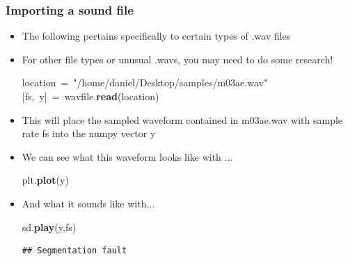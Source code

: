 \documentclass{beamer}\usepackage[]{graphicx}\usepackage[]{color}
\makeatletter
\newcommand{\hlstr}[1]{\textcolor[rgb]{0.192,0.494,0.8}{#1}}%
\newcommand{\hlopt}[1]{\textcolor[rgb]{0,0,0}{#1}}%
\newcommand{\hlstd}[1]{\textcolor[rgb]{0.345,0.345,0.345}{#1}}%
\newcommand{\hlkwd}[1]{\textcolor[rgb]{0.737,0.353,0.396}{\textbf{#1}}}%
\newenvironment{kframe}{%
 \def\at@end@of@kframe{}%
 \ifinner\ifhmode%
  \def\at@end@of@kframe{\end{minipage}}%
  \begin{minipage}{\columnwidth}%
 \fi\fi%
 \def\FrameCommand##1{\hskip\@totalleftmargin \hskip-\fboxsep
 \colorbox{shadecolor}{##1}\hskip-\fboxsep
     \hskip-\linewidth \hskip-\@totalleftmargin \hskip\columnwidth}%
 \MakeFramed {\advance\hsize-\width
   \@totalleftmargin\z@ \linewidth\hsize
   \@setminipage}}%
 {\par\unskip\endMakeFramed%
 \at@end@of@kframe}
\newenvironment{knitrout}{}{} %
\makeatother
\begin{document}
\begin{frame}[fragile]
\frametitle{Importing a sound file}
\begin{itemize}
	\item The following pertains specifically to certain types of .wav files
	\item For other file types or unusual .wavs, you may need to do some research!
\begin{knitrout}
\color{fgcolor}\begin{kframe}
\noindent
\ttfamily
\hlstd{location\ }\hlopt{=\ }\hlstd{}\hlstr{"/home/daniel/Desktop/samples/m03ae.wav"}\hlstd{}\hspace*{\fill}\\
\hlopt{{[}}\hlstd{fs}\hlopt{,\ }\hlstd{y}\hlopt{{]}\ =\ }\hlstd{wavfile}\hlopt{.}\hlstd{}\hlkwd{read}\hlstd{}\hlopt{(}\hlstd{location}\hlopt{)}\hlstd{}\hspace*{\fill}
\mbox{}
\normalfont
\end{kframe}
\end{knitrout}

	\item This will place the sampled waveform contained in m03ae.wav with sample rate fs into the numpy vector y

	\item We can see what this waveform looks like with ...

\begin{knitrout}
\color{fgcolor}\begin{kframe}
\noindent
\ttfamily
\hlstd{plt}\hlopt{.}\hlstd{}\hlkwd{plot}\hlstd{}\hlopt{(}\hlstd{y}\hlopt{)}\hlstd{}\hspace*{\fill}
\mbox{}
\normalfont
\end{kframe}
\end{knitrout}

	\item And what it sounds like with...

\begin{knitrout}
\color{fgcolor}\begin{kframe}
\noindent
\ttfamily
\hlstd{sd}\hlopt{.}\hlstd{}\hlkwd{play}\hlstd{}\hlopt{(}\hlstd{y}\hlopt{,}\hlstd{fs}\hlopt{)}\hlstd{}\hspace*{\fill}
\mbox{}
\normalfont

\begin{verbatim}
## Segmentation fault
\end{verbatim}
\end{kframe}
\end{knitrout}
\end{itemize}
\end{frame}
\end{document}
